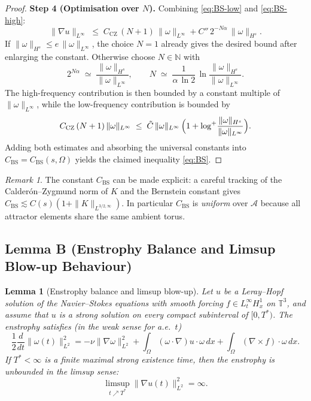 \documentclass[12pt,a4paper]{article}
\theoremstyle{definition}
\theoremstyle{plain}
\newtheorem{lemma}[definition]{Lemma}
\theoremstyle{remark}
\newtheorem{remark}[definition]{Remark}
\begin{document}
\begin{proof}
\medskip
\noindent\textbf{Step 4 (Optimisation over $N$).}
Combining \eqref{eq:BS-low} and \eqref{eq:BS-high}:
\[
    \|\nabla u\|_{L^\infty}
    \;\le\; C_{\mathrm{CZ}}\,(N+1)\,\|\omega\|_{L^\infty}
          + C''\,2^{-N\alpha}\,\|\omega\|_{H^s}.
\]
If $\|\omega\|_{H^s}\le e\,\|\omega\|_{L^\infty}$, the choice $N=1$
already gives the desired bound after enlarging the constant.  Otherwise
choose $N \in \mathbb{N}$ with
\[
    2^{N\alpha} \;\simeq\; \frac{\|\omega\|_{H^s}}{\|\omega\|_{L^\infty}},
    \qquad
    N \;\simeq\; \frac{1}{\alpha\,\ln 2}\,
            \ln\!\frac{\|\omega\|_{H^s}}{\|\omega\|_{L^\infty}}.
\]
The high-frequency contribution is then bounded by a constant multiple of
$\|\omega\|_{L^\infty}$, while the low-frequency contribution is bounded by
\[
    C_{\mathrm{CZ}}\,(N+1)\,\|\omega\|_{L^\infty}
    \;\le\; \tilde C\,\|\omega\|_{L^\infty}\,
            \Bigl(1 + \log^+\!\frac{\|\omega\|_{H^s}}{\|\omega\|_{L^\infty}}\Bigr).
\]
Adding both estimates and absorbing the universal constants into
$C_{\mathrm{BS}} = C_{\mathrm{BS}}(s,\Omega)$ yields the claimed inequality
\eqref{eq:BS}.
\end{proof}

\begin{remark}
The constant $C_{\mathrm{BS}}$ can be made explicit: a careful tracking of the
Calder\'{o}n--Zygmund norm of $K$ and the Bernstein constant gives
$C_{\mathrm{BS}} \lesssim C(s)(1 + \|K\|_{L^{3/2,\infty}})$.  In particular
$C_{\mathrm{BS}}$ is \emph{uniform} over $\mathcal{A}$ because all attractor
elements share the same ambient torus.
\end{remark}

\subsection*{Lemma B (Enstrophy Balance and Limsup Blow-up Behaviour)}
\begin{lemma}[Enstrophy balance and limsup blow-up]
\label{lem:enstrophy}
Let $u$ be a Leray--Hopf solution of the Navier--Stokes equations with smooth
forcing $f \in L^\infty_t H^1_x$ on $\mathbb{T}^3$, and assume that $u$ is a
strong solution on every compact subinterval of $[0,T^*)$.  The enstrophy
satisfies (in the weak sense for a.e.\ $t$)
\begin{equation}\label{eq:enstrophy}
    \frac{1}{2}\frac{d}{dt}\|\omega(t)\|_{L^2}^2
    = -\nu\|\nabla\omega\|_{L^2}^2
      + \int_\Omega (\omega\cdot\nabla)u\cdot\omega\,dx
      + \int_\Omega (\nabla\times f)\cdot\omega\,dx.
\end{equation}
If $T^*<\infty$ is a finite maximal strong existence time, then the enstrophy
is unbounded in the limsup sense:
\begin{equation}\label{eq:diss-blowup}
    \limsup_{t \nearrow T^*}\|\nabla u(t)\|_{L^2}^2 = \infty.
\end{equation}
\end{lemma}
\end{document}
